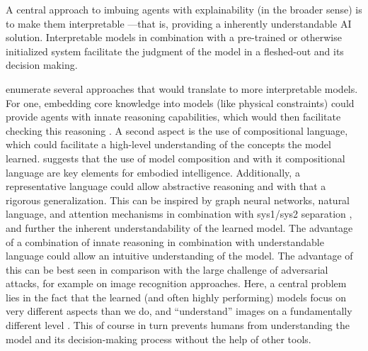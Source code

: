 \documentclass[twoside,11pt]{article}
\begin{document}
A central approach to imbuing agents with explainability (in the broader sense) is to make them interpretable ---that is, providing a inherently understandable AI solution. Interpretable models in combination with a pre-trained or otherwise initialized system facilitate the judgment of the model in a fleshed-out and its decision making.

\citet{RoyEtAl:2021:RLRoboticsChallenges} enumerate several approaches that would translate to more interpretable models. For one, embedding core knowledge into models (like physical constraints) could provide agents with innate reasoning capabilities, which would then facilitate checking this reasoning \citep{HaSchmidhuber:2018:CoreKnowledgeWorldModels}. A second aspect is the use of compositional language, which could facilitate a high-level understanding of the concepts the model learned. \citet{Koditschek:2021:RoboticsCompositionalLanguage} suggests that the use of model composition and with it compositional language are key elements for embodied intelligence.
Additionally, a representative language could allow abstractive reasoning and with that a rigorous generalization. This can be inspired by graph neural networks, natural language, and attention mechanisms in combination with sys1/sys2 separation \citep{RoyEtAl:2021:RLRoboticsChallenges}, and further the inherent understandability of the learned model.
The advantage of a combination of innate reasoning in combination with understandable language could allow an intuitive understanding of the model. The advantage of this can be best seen in comparison with the large challenge of adversarial attacks, for example on image recognition approaches. Here, a central problem lies in the fact that the learned (and often highly performing) models focus on very different aspects than we do, and ``understand'' images on a fundamentally different level \citep{ChakrabortyEtAl:2021:SurveyAdversarialAttacks}. This of course in turn prevents humans from understanding the model and its decision-making process without the help of other tools.
\end{document}
